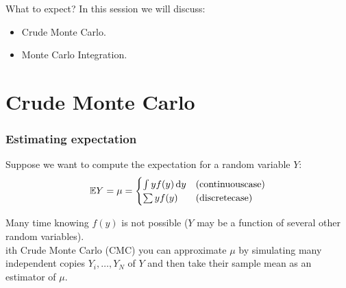 \documentclass{beamer}
\begin{document}
\begin{frame}{What to expect?}
  In this session we will discuss:
  \begin{itemize}
    \item Crude Monte Carlo.
    \item Monte Carlo Integration.
  \end{itemize}
\end{frame}

\section{Crude Monte Carlo}

\begin{frame}
\frametitle{Estimating expectation}

Suppose we want to compute the expectation for a random variable $Y$:
\[
    \mathbb{E} Y = \mu = \begin{cases}
        \int y f(y) \mathop{}\!\mathrm{d} y & \mathrm{(continuous case)}\\
        \sum y f(y) & \mathrm{(discrete case)}
    \end{cases}
    \]

    Many time knowing $f(y)$ is not possible ($Y$ may be a function of several other random variables).
    \\[10pt]
    ith Crude Monte Carlo (CMC) you can approximate $\mu$ by simulating many independent copies $Y_i,\ldots,Y_N$ of $Y$ and then take their sample mean as an estimator of $\mu$.

\end{frame}
\end{document}
